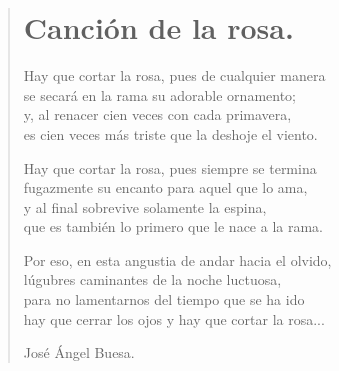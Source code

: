 \documentclass[11pt, portrait, twoside, notitlepage, openright]{book}
\begin{document}
\newpage
\begin{verse}
\begin{center}
\section{Canción de la rosa.}
\end{center}
Hay que cortar la rosa, pues de cualquier manera\\
se secará en la rama su adorable ornamento;\\
y, al renacer cien veces con cada primavera,\\
es cien veces más triste que la deshoje el viento.
\newline

Hay que cortar la rosa, pues siempre se termina\\
fugazmente su encanto para aquel que lo ama,\\
y al final sobrevive solamente la espina,\\
que es también lo primero que le nace a la rama.
\newline

Por eso, en esta angustia de andar hacia el olvido,\\
lúgubres caminantes de la noche luctuosa,\\
para no lamentarnos del tiempo que se ha ido\\
hay que cerrar los ojos y hay que cortar la rosa...
\newline

José Ángel Buesa.
\end{verse}
\end{document}

